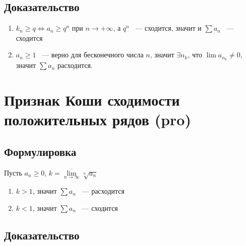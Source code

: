 \documentclass{article}
\begin{document}
        \subsection{Доказательство}
        
            \begin{enumerate}
            
                \item $k_n \geq q \Leftrightarrow a_n \geq q^n$ при $n \rightarrow +\infty$, а $q^n$ ~--- сходится, значит и $\sum a_n$ ~--- сходится
                
                \item $a_n \geq 1$ ~--- верно для бесконечного числа $n$, значит $\exists n_k$, что $\lim a_{n_k} \neq 0$, значит $\sum a_n$ расходится.
                
            \end{enumerate}
            
    \newpage
    
    \section{Признак Коши сходимости положительных рядов (pro)}
    
        \subsection{Формулировка}
        
            Пусть $a_n \geq 0$, $k = \overline{\lim\limits_{n \rightarrow \infty}} \sqrt[n]{a_n}$
            
            \begin{enumerate}
            
                \item $k > 1$, значит $\sum a_n$ ~--- расходится
                
                \item $k < 1$, значит $\sum a_n$ ~--- сходится
                
            \end{enumerate}
            
        \subsection{Доказательство}
        
\end{document}
